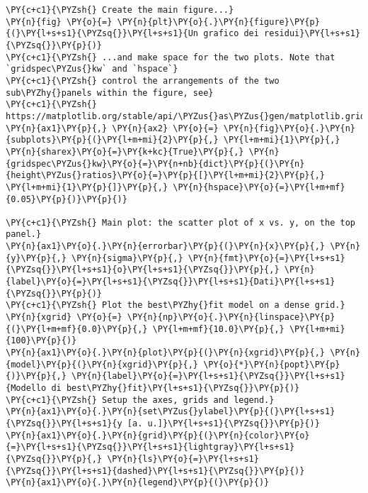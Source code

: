 \begin{Verbatim}[label=\makebox{\href{https://bitbucket.org/lbaldini/statnotes/src/master/snippets/residual\_plot.py}{https://bitbucket.org/.../residual\_plot.py}},commandchars=\\\{\}]
\PY{c+c1}{\PYZsh{} Create the main figure...}
\PY{n}{fig} \PY{o}{=} \PY{n}{plt}\PY{o}{.}\PY{n}{figure}\PY{p}{(}\PY{l+s+s1}{\PYZsq{}}\PY{l+s+s1}{Un grafico dei residui}\PY{l+s+s1}{\PYZsq{}}\PY{p}{)}
\PY{c+c1}{\PYZsh{} ...and make space for the two plots. Note that `gridspec\PYZus{}kw` and `hspace`}
\PY{c+c1}{\PYZsh{} control the arrangements of the two sub\PYZhy{}panels within the figure, see}
\PY{c+c1}{\PYZsh{} https://matplotlib.org/stable/api/\PYZus{}as\PYZus{}gen/matplotlib.gridspec.GridSpec.html}
\PY{n}{ax1}\PY{p}{,} \PY{n}{ax2} \PY{o}{=} \PY{n}{fig}\PY{o}{.}\PY{n}{subplots}\PY{p}{(}\PY{l+m+mi}{2}\PY{p}{,} \PY{l+m+mi}{1}\PY{p}{,} \PY{n}{sharex}\PY{o}{=}\PY{k+kc}{True}\PY{p}{,} \PY{n}{gridspec\PYZus{}kw}\PY{o}{=}\PY{n+nb}{dict}\PY{p}{(}\PY{n}{height\PYZus{}ratios}\PY{o}{=}\PY{p}{[}\PY{l+m+mi}{2}\PY{p}{,} \PY{l+m+mi}{1}\PY{p}{]}\PY{p}{,} \PY{n}{hspace}\PY{o}{=}\PY{l+m+mf}{0.05}\PY{p}{)}\PY{p}{)}

\PY{c+c1}{\PYZsh{} Main plot: the scatter plot of x vs. y, on the top panel.}
\PY{n}{ax1}\PY{o}{.}\PY{n}{errorbar}\PY{p}{(}\PY{n}{x}\PY{p}{,} \PY{n}{y}\PY{p}{,} \PY{n}{sigma}\PY{p}{,} \PY{n}{fmt}\PY{o}{=}\PY{l+s+s1}{\PYZsq{}}\PY{l+s+s1}{o}\PY{l+s+s1}{\PYZsq{}}\PY{p}{,} \PY{n}{label}\PY{o}{=}\PY{l+s+s1}{\PYZsq{}}\PY{l+s+s1}{Dati}\PY{l+s+s1}{\PYZsq{}}\PY{p}{)}
\PY{c+c1}{\PYZsh{} Plot the best\PYZhy{}fit model on a dense grid.}
\PY{n}{xgrid} \PY{o}{=} \PY{n}{np}\PY{o}{.}\PY{n}{linspace}\PY{p}{(}\PY{l+m+mf}{0.0}\PY{p}{,} \PY{l+m+mf}{10.0}\PY{p}{,} \PY{l+m+mi}{100}\PY{p}{)}
\PY{n}{ax1}\PY{o}{.}\PY{n}{plot}\PY{p}{(}\PY{n}{xgrid}\PY{p}{,} \PY{n}{model}\PY{p}{(}\PY{n}{xgrid}\PY{p}{,} \PY{o}{*}\PY{n}{popt}\PY{p}{)}\PY{p}{,} \PY{n}{label}\PY{o}{=}\PY{l+s+s1}{\PYZsq{}}\PY{l+s+s1}{Modello di best\PYZhy{}fit}\PY{l+s+s1}{\PYZsq{}}\PY{p}{)}
\PY{c+c1}{\PYZsh{} Setup the axes, grids and legend.}
\PY{n}{ax1}\PY{o}{.}\PY{n}{set\PYZus{}ylabel}\PY{p}{(}\PY{l+s+s1}{\PYZsq{}}\PY{l+s+s1}{y [a. u.]}\PY{l+s+s1}{\PYZsq{}}\PY{p}{)}
\PY{n}{ax1}\PY{o}{.}\PY{n}{grid}\PY{p}{(}\PY{n}{color}\PY{o}{=}\PY{l+s+s1}{\PYZsq{}}\PY{l+s+s1}{lightgray}\PY{l+s+s1}{\PYZsq{}}\PY{p}{,} \PY{n}{ls}\PY{o}{=}\PY{l+s+s1}{\PYZsq{}}\PY{l+s+s1}{dashed}\PY{l+s+s1}{\PYZsq{}}\PY{p}{)}
\PY{n}{ax1}\PY{o}{.}\PY{n}{legend}\PY{p}{(}\PY{p}{)}


\end{Verbatim}

